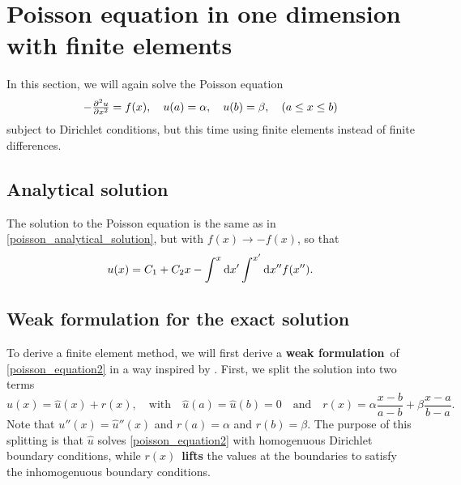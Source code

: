 \section{Poisson equation in one dimension with finite elements}

\newcommand\basisexpand[2]{\sum_{i=0}^{M+1} #1_i \varphi_i(#2)}

In this section, we will again solve the Poisson equation
\begin{equation}
	-\pd[2]{u}{x} = f(x), \quad u(a) = \alpha, \quad u(b) = \beta, \quad (a \leq x \leq b)
	\label{poisson_equation2}
\end{equation}
subject to Dirichlet conditions, but this time using finite elements instead of finite differences.

\subsection{Analytical solution}

The solution to the Poisson equation is the same as in \ref{poisson_analytical_solution}, but with $f(x) \rightarrow -f(x)$, so that
\begin{equation}
u(x) = C_1 + C_2 x - \int^x \dif x' \int^{x'} \dif x'' f(x'').
\label{poisson_analytical_solution2}
\end{equation}

\subsection{Weak formulation for the exact solution}

To derive a finite element method, we will first derive a \textbf{weak formulation} of \ref{poisson_equation2} in a way inspired by \cite{curry}.
First, we split the solution into two terms
\begin{equation}
	u(x) = \hat{u}(x) + r(x), \quad \text{with} \quad \hat{u}(a) = \hat{u}(b) = 0 \quad \text{and} \quad r(x) = \alpha \frac{x-b}{a-b} + \beta \frac{x-a}{b-a}.
	\label{splitting_exact}
\end{equation}
Note that $u''(x) = \hat{u}''(x)$ and $r(a) = \alpha$ and $r(b) = \beta$.
The purpose of this splitting is that $\hat{u}$ solves \ref{poisson_equation2} with homogenuous Dirichlet boundary conditions, while $r(x)$ \textbf{lifts} the values at the boundaries to satisfy the inhomogenuous boundary conditions.


